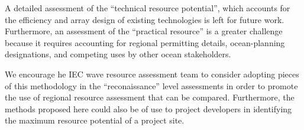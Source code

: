 A detailed assessment of the ``technical resource potential'', which accounts for the efficiency and array design of existing technologies is left for future work. Furthermore, an assessment of the ``practical resource'' is a greater challenge because it requires accounting for regional permitting details, ocean-planning designations, and competing uses by other ocean stakeholders.

We encourage he IEC wave resource assessment team to consider adopting pieces of this methodology in the ``reconaissance'' level assessments in order to promote the use of regional resource assessment that can be compared. Furthermore, the methods proposed here could also be of use to project developers in identifying the maximum resource potential of a project site. 


